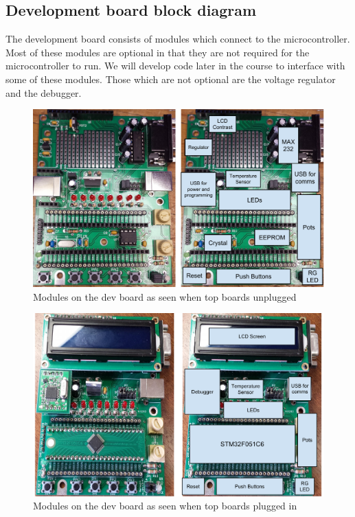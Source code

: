 \subsection{Development board block diagram}
The development board consists of modules which connect to the microcontroller. Most of these modules are optional in that they are not required for the microcontroller to run. We will develop code later in the course to interface with some of these modules. Those which are not optional are the voltage regulator and the debugger.

\begin{figure}
  \centering
  \includegraphics[width=\textwidth]{./week1/dev_board_unplugged.pdf}
  \caption{Modules on the dev board as seen when top boards unplugged}
\end{figure}
\begin{figure}
  \centering
  \includegraphics[width=\textwidth]{./week1/dev_board_plugged_in.pdf}
  \caption{Modules on the dev board as seen when top boards plugged in}
\end{figure}

